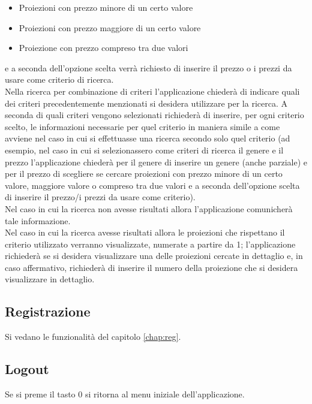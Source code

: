 \documentclass[a4paper, 12pt, titlepage, openany]{book}
\begin{document}
\begin{center}
\begin{varwidth}{\textwidth}
\begin{itemize}
\item[•] Proiezioni con prezzo minore di un certo valore
\item[•] Proiezioni con prezzo maggiore di un certo valore
\item[•] Proiezione con prezzo compreso tra due valori
\end{itemize}
\end{varwidth}
\end{center}

e a seconda dell’opzione scelta verrà richiesto di inserire il prezzo o i prezzi da usare come criterio di ricerca.\\
Nella ricerca per combinazione di criteri l’applicazione chiederà di indicare quali dei criteri precedentemente menzionati si desidera utilizzare per la ricerca. A seconda di quali criteri vengono selezionati richiederà di inserire, per ogni criterio scelto, le informazioni necessarie per quel criterio in maniera simile a come avviene nel caso in cui si effettuasse una ricerca secondo solo quel criterio (ad esempio, nel caso in cui si selezionassero come criteri di ricerca il genere e il prezzo l’applicazione chiederà per il genere di inserire un genere (anche parziale) e per il prezzo di scegliere se cercare proiezioni con prezzo minore di un certo valore, maggiore valore o compreso tra due valori e a seconda dell’opzione scelta di inserire il prezzo/i prezzi da usare come criterio).\\
Nel caso in cui la ricerca non avesse risultati allora l’applicazione comunicherà tale informazione.\\
Nel caso in cui la ricerca avesse risultati allora le proiezioni che rispettano il criterio utilizzato verranno visualizzate, numerate a partire da 1; l’applicazione richiederà se si desidera visualizzare una delle proiezioni cercate in dettaglio e, in caso affermativo, richiederà di inserire il numero della proiezione che si desidera visualizzare in dettaglio.

\subsection{Registrazione}
Si vedano le funzionalità del capitolo \ref{chap:reg}.

\subsection{Logout}
Se si preme il tasto 0 si ritorna al menu iniziale dell'applicazione.
\end{document}
